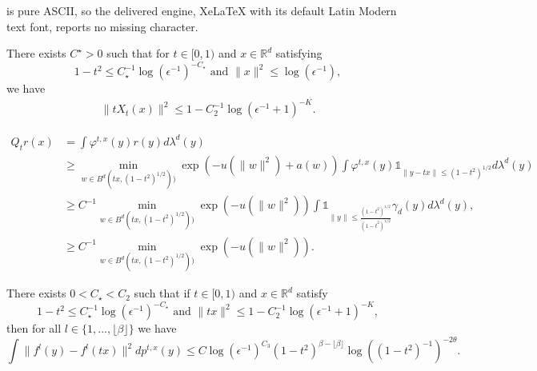 \documentclass[10pt,a4paper]{amsart}
\begin{document}
is pure ASCII, so the delivered engine, XeLaTeX with its default Latin Modern text font, reports no missing character.
\begin{proposition}\label{prop:loca3}
There exists $C^\star>0$ such that for $t\in [0,1)$  and $x\in \mathbb{R}^d$ satisfying \begin{equation*}
1-t^2\leq C_\star^{-1}\log(\epsilon^{-1})^{-C_\star} \text{ and } \|x\|^2\leq \log(\epsilon^{-1}),
\end{equation*} 
we have
\begin{align*}
\|tX_t(x)\|^2 \leq 1-C_2^{-1}\log(\epsilon^{-1}+1)^{-K}.
\end{align*}
\end{proposition}

\begin{align}\label{align:boundbelowq}
    Q_{t}r(x) & = \int \varphi^{t,x}(y)r(y)d\lambda^d(y)\nonumber\\
    & \geq  \min_{w\in B^d(tx,(1-t^2)^{1/2}))}\exp\left(-u(\|w\|^2)+a(w)\right)\int \varphi^{t,x}(y)\mathds{1}_{\|y-tx\|\leq(1-t^2)^{1/2}}d\lambda^d(y)\nonumber\\
    & \geq C^{-1}\min_{w\in B^d(tx,(1-t^2)^{1/2}))}\exp\left(-u(\|w\|^2)\right)\int \mathds{1}_{\|y\|\leq\frac{(1-t^2)^{1/2}}{(1-t^2)^{1/2}}}\gamma_d(y)d\lambda^d(y),\nonumber\\
    & \geq C^{-1}\min_{w\in B^d(tx,(1-t^2)^{1/2}))}\exp\left(-u(\|w\|^2)\right).
\end{align}

\begin{proposition}\label{prop:concentration3}
There exists  $0<C_\star<C_2$ such that if $t\in [0,1)$  and $x\in \mathbb{R}^d$ satisfy \begin{equation}\label{eq:hyp14}
1-t^2\leq C_\star^{-1}\log(\epsilon^{-1})^{-C_\star} \text{ and } \|tx\|^2\leq 1-C_2^{-1}\log(\epsilon^{-1}+1)^{-K},
\end{equation}
then for all $l\in \{1,...,\lfloor \beta \rfloor\}$ we have
    $$\int \|f^l(y)-f^l(tx)\|^2dp^{t,x}(y)\leq C\log(\epsilon^{-1})^{C_3}(1-t^2)^{\beta-\lfloor \beta \rfloor }\log((1-t^2)^{-1})^{-2\theta}.$$
\end{proposition}
\end{document}
